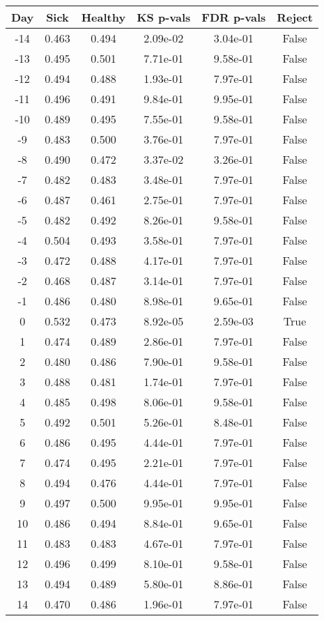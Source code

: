 \begin{tabular}{c|c|c|c|c|c}
Day &  Sick & Healthy &  KS p-vals & FDR p-vals & Reject\\
\hline
-14 & 0.463 &   0.494 &   2.09e-02 &   3.04e-01 &  False\\
-13 & 0.495 &   0.501 &   7.71e-01 &   9.58e-01 &  False\\
-12 & 0.494 &   0.488 &   1.93e-01 &   7.97e-01 &  False\\
-11 & 0.496 &   0.491 &   9.84e-01 &   9.95e-01 &  False\\
-10 & 0.489 &   0.495 &   7.55e-01 &   9.58e-01 &  False\\
 -9 & 0.483 &   0.500 &   3.76e-01 &   7.97e-01 &  False\\
 -8 & 0.490 &   0.472 &   3.37e-02 &   3.26e-01 &  False\\
 -7 & 0.482 &   0.483 &   3.48e-01 &   7.97e-01 &  False\\
 -6 & 0.487 &   0.461 &   2.75e-01 &   7.97e-01 &  False\\
 -5 & 0.482 &   0.492 &   8.26e-01 &   9.58e-01 &  False\\
 -4 & 0.504 &   0.493 &   3.58e-01 &   7.97e-01 &  False\\
 -3 & 0.472 &   0.488 &   4.17e-01 &   7.97e-01 &  False\\
 -2 & 0.468 &   0.487 &   3.14e-01 &   7.97e-01 &  False\\
 -1 & 0.486 &   0.480 &   8.98e-01 &   9.65e-01 &  False\\
  0 & 0.532 &   0.473 &   8.92e-05 &   2.59e-03 &   True\\
  1 & 0.474 &   0.489 &   2.86e-01 &   7.97e-01 &  False\\
  2 & 0.480 &   0.486 &   7.90e-01 &   9.58e-01 &  False\\
  3 & 0.488 &   0.481 &   1.74e-01 &   7.97e-01 &  False\\
  4 & 0.485 &   0.498 &   8.06e-01 &   9.58e-01 &  False\\
  5 & 0.492 &   0.501 &   5.26e-01 &   8.48e-01 &  False\\
  6 & 0.486 &   0.495 &   4.44e-01 &   7.97e-01 &  False\\
  7 & 0.474 &   0.495 &   2.21e-01 &   7.97e-01 &  False\\
  8 & 0.494 &   0.476 &   4.44e-01 &   7.97e-01 &  False\\
  9 & 0.497 &   0.500 &   9.95e-01 &   9.95e-01 &  False\\
 10 & 0.486 &   0.494 &   8.84e-01 &   9.65e-01 &  False\\
 11 & 0.483 &   0.483 &   4.67e-01 &   7.97e-01 &  False\\
 12 & 0.496 &   0.499 &   8.10e-01 &   9.58e-01 &  False\\
 13 & 0.494 &   0.489 &   5.80e-01 &   8.86e-01 &  False\\
 14 & 0.470 &   0.486 &   1.96e-01 &   7.97e-01 &  False\\
\end{tabular}